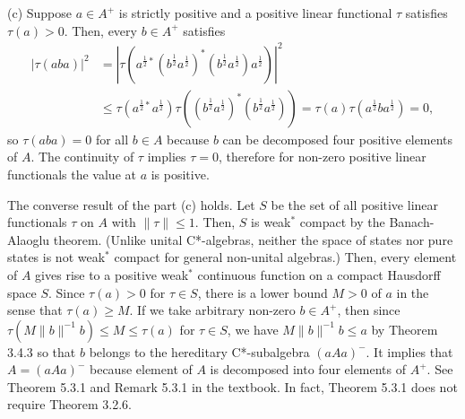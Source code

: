 \documentclass{../solution}
\begin{document}
\begin{sol}
(c)
Suppose $a\in A^+$ is strictly positive and a positive linear functional $\tau$ satisfies $\tau(a)>0$.
Then, every $b\in A^+$ satisfies
\begin{align*}
|\tau(aba)|^2
&=|\tau(a^{\frac12*}(b^\frac12a^\frac12)^*(b^\frac12a^\frac12)a^\frac12)|^2\\
&\le\tau(a^{\frac12*}a^\frac12)\tau((b^\frac12a^\frac12)^*(b^\frac12a^\frac12))
=\tau(a)\tau(a^\frac12ba^\frac12)=0,
\end{align*}
so $\tau(aba)=0$ for all $b\in A$ because $b$ can be decomposed four positive elements of $A$.
The continuity of $\tau$ implies $\tau=0$, therefore for non-zero positive linear functionals the value at $a$ is positive.
\end{sol}
\begin{rmk}
The converse result of the part (c) holds.
Let $S$ be the set of all positive linear functionals $\tau$ on $A$ with $\|\tau\|\le1$.
Then, $S$ is weak$^*$ compact by the Banach-Alaoglu theorem.
(Unlike unital C*-algebras, neither the space of states nor pure states is not weak$^*$ compact for general non-unital algebras.)
Then, every element of $A$ gives rise to a positive weak$^*$ continuous function on a compact Hausdorff space $S$.
Since $\tau(a)>0$ for $\tau\in S$, there is a lower bound $M>0$ of $a$ in the sense that $\tau(a)\ge M$.
If we take arbitrary non-zero $b\in A^+$, then since $\tau(M\|b\|^{-1}b)\le M\le\tau(a)$ for $\tau\in S$, we have $M\|b\|^{-1}b\le a$ by Theorem 3.4.3 so that $b$ belongs to the hereditary C*-subalgebra $(aAa)^-$.
It implies that $A=(aAa)^-$ because element of $A$ is decomposed into four elements of $A^+$.
See Theorem 5.3.1 and Remark 5.3.1 in the textbook.
In fact, Theorem 5.3.1 does not require Theorem 3.2.6.
\end{rmk}%
\end{document}

